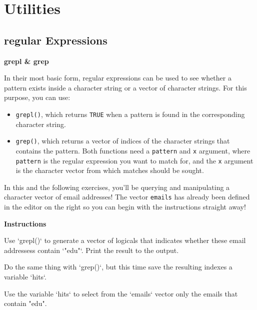 \documentclass[]{article}
\newcommand{\hlstr}[1]{\textcolor[rgb]{0.251,0.627,0.251}{#1}}%
\newcommand{\hlstd}[1]{\textcolor[rgb]{0.251,0.251,0.251}{#1}}%
\newcommand{\hlkwc}[1]{\textcolor[rgb]{0.251,0.251,0.251}{#1}}%
\newenvironment{Shaded}{\begin{myshaded}}{\end{myshaded}}
\newcommand{\DataTypeTok}[1]{\hlkwc{#1}}
\newcommand{\StringTok}[1]{\hlstr{#1}}
\newcommand{\NormalTok}[1]{\hlstd{#1}}
\begin{document}
\section{Utilities}\label{utilities}

\subsection{regular Expressions}\label{regular-expressions}

\textbf{grepl \& grep}

In their most basic form, regular expressions can be used to see whether
a pattern exists inside a character string or a vector of character
strings. For this purpose, you can use:

\begin{itemize}
\item
  \texttt{grepl()}, which returns \texttt{TRUE} when a pattern is found
  in the corresponding character string.
\item
  \texttt{grep()}, which returns a vector of indices of the character
  strings that contains the pattern. Both functions need a
  \texttt{pattern} and \texttt{x} argument, where \texttt{pattern} is
  the regular expression you want to match for, and the \texttt{x}
  argument is the character vector from which matches should be sought.
\end{itemize}

In this and the following exercises, you'll be querying and manipulating
a character vector of email addresses! The vector \texttt{emails} has
already been defined in the editor on the right so you can begin with
the instructions straight away!

\textbf{Instructions}

\begin{Shaded}
\begin{Highlighting}[]
\OperatorTok{*}\StringTok{ }\NormalTok{Use }\StringTok{`}\DataTypeTok{grepl()}\StringTok{`}\NormalTok{ to generate a vector of logicals that indicates whether these email addressess contain }\StringTok{`}\DataTypeTok{"edu"}\StringTok{`}\NormalTok{. Print the result to the output.}

\OperatorTok{*}\StringTok{ }\NormalTok{Do the same thing with }\StringTok{`}\DataTypeTok{grep()}\StringTok{`}\NormalTok{, but this time save the resulting indexes }\NormalTok{ a variable }\StringTok{`}\DataTypeTok{hits}\StringTok{`}\NormalTok{.}

\OperatorTok{*}\StringTok{ }\NormalTok{Use the variable }\StringTok{`}\DataTypeTok{hits}\StringTok{`}\NormalTok{ to select from the }\StringTok{`}\DataTypeTok{emails}\StringTok{`}\NormalTok{ vector only the emails that contain }\StringTok{"edu"}\NormalTok{.}
\end{Highlighting}
\end{Shaded}
\end{document}
